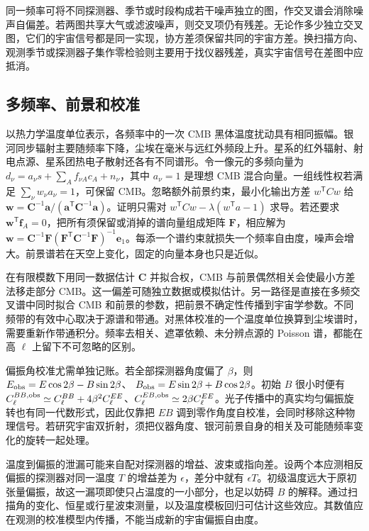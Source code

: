 同一频率可将不同探测器、季节或时段构成若干噪声独立的图，作交叉谱会消除噪声自偏差。若两图共享大气或滤波噪声，则交叉项仍有残差。无论作多少独立交叉图，它们的宇宙信号都是同一实现，协方差须保留共同的宇宙方差。换扫描方向、观测季节或探测器子集作零检验则主要用于找仪器残差，真实宇宙信号在差图中应抵消。

\subsection{多频率、前景和校准}

以热力学温度单位表示，各频率中的一次 CMB 黑体温度扰动具有相同振幅。银河同步辐射主要随频率下降，尘埃在毫米与远红外频段上升。星系的红外辐射、射电点源、星系团热电子散射还各有不同谱形。令一像元的多频向量为 $d_\nu=a_\nu s+\sum_Af_{\nu A}c_A+n_\nu$，其中 $a_\nu=1$ 是理想 CMB 混合向量。一组线性权若满足 $\sum_\nu w_\nu a_\nu=1$，可保留 CMB。忽略额外前景约束，最小化输出方差 $w^\mathsf TCw$ 给 $\bm w=\bm C^{-1}\bm a/(\bm a^\mathsf T\bm C^{-1}\bm a)$。证明只需对 $w^\mathsf TCw-\lambda(w^\mathsf Ta-1)$ 求导。若还要求 $\bm w^\mathsf T\bm f_A=0$，把所有须保留或消掉的谱向量组成矩阵 $\bm F$，相应解为
$\bm w=\bm C^{-1}\bm F(\bm F^\mathsf T\bm C^{-1}\bm F)^{-1}\bm e_1$。每添一个谱约束就损失一个频率自由度，噪声会增大。前景谱若在天空上变化，固定的向量本身也只是近似。

在有限模数下用同一数据估计 $\bm C$ 并拟合权，CMB 与前景偶然相关会使最小方差法移走部分 CMB。这一偏差可随独立数据或模拟估计。另一路径是直接在多频交叉谱中同时拟合 CMB 和前景的参数，把前景不确定性传播到宇宙学参数。不同频带的有效中心取决于源谱和带通。对黑体校准的一个温度单位换算到尘埃谱时，需要重新作带通积分。频率去相关、遮罩依赖、未分辨点源的 Poisson 谱，都能在高 $\ell$ 上留下不可忽略的区别。

偏振角校准尤需单独记账。若全部探测器角度偏了 $\beta$，则
$E_{\rm obs}=E\cos2\beta-B\sin2\beta$、
$B_{\rm obs}=E\sin2\beta+B\cos2\beta$。初始 $B$ 很小时便有 $C_\ell^{BB,\rm obs}\simeq C_\ell^{BB}+4\beta^2C_\ell^{EE}$、$C_\ell^{EB,\rm obs}\simeq2\beta C_\ell^{EE}$。光子传播中的真实均匀偏振旋转也有同一代数形式，因此仅靠把 $EB$ 调到零作角度自校准，会同时移除这种物理信号。若研究宇宙双折射，须把仪器角度、银河前景自身的相关及可能随频率变化的旋转一起处理。

温度到偏振的泄漏可能来自配对探测器的增益、波束或指向差。设两个本应测相反偏振的探测器对同一温度 $T$ 的增益差为 $\epsilon$，差分中就有 $\epsilon T$。初级温度远大于原初张量偏振，故这一漏项即使只占温度的一小部分，也足以妨碍 $B$ 的解释。通过扫描角的变化、恒星或行星波束测量，以及温度模板回归可估计这些效应。其数值应在观测的校准模型内传播，不能当成新的宇宙偏振自由度。

